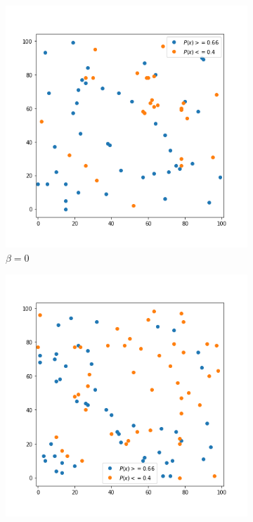 \begin{figure}[!ht]
	\centering
	\begin{subfigure}{.3\textwidth}
    	\centering
    	\includegraphics[width=1\linewidth]{Bilder/simulation_2_3}
    	\caption{$\beta=0$}
    \label{fig:meine-grafik}
	\end{subfigure}%
		\begin{subfigure}{.3\textwidth}
	    \centering
	    \includegraphics[width=1\linewidth]{Bilder/simulation_3_3}

\end{subfigure}
\end{figure}
